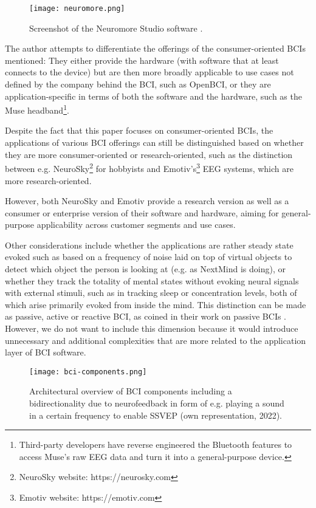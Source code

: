 \begin{figure}[ht]
  \centering
  \texttt{[image: neuromore.png]}
  \caption{Screenshot of the Neuromore Studio software \citep{neuromore_neuromore_nodate}.}
  \label{fig:neuromore}
\end{figure}

The author attempts to differentiate the offerings of the consumer-oriented BCIs mentioned: They either provide the hardware (with software that at least connects to the device) but are then more broadly applicable to use cases not defined by the company behind the BCI, such as OpenBCI, or they are application-specific in terms of both the software and the hardware, such as the Muse headband\footnote{Third-party developers have reverse engineered the Bluetooth features to access Muse's raw EEG data and turn it into a general-purpose device.}.

Despite the fact that this paper focuses on consumer-oriented BCIs, the applications of various BCI offerings can still be distinguished based on whether they are more consumer-oriented or research-oriented, such as the distinction between e.g. NeuroSky\footnote{NeuroSky website: https://neurosky.com} for hobbyists and Emotiv's\footnote{Emotiv website: https://emotiv.com} EEG systems, which are more research-oriented.

However, both NeuroSky and Emotiv provide a research version as well as a consumer or enterprise version of their software and hardware, aiming for general-purpose applicability across customer segments and use cases.

Other considerations include whether the applications are rather steady state evoked such as based on a frequency of noise laid on top of virtual objects to detect which object the person is looking at (e.g. as NextMind is doing), or whether they track the totality of mental states without evoking neural signals with external stimuli, such as in tracking sleep or concentration levels, both of which arise primarily evoked from inside the mind. This distinction can be made as passive, active or reactive BCI, as \citeauthor{alimardani_passive_2020} coined in their work on passive BCIs \citep{alimardani_passive_2020}. However, we do not want to include this dimension because it would introduce unnecessary and additional complexities that are more related to the application layer of BCI software.

\begin{figure}[!ht]
  \centering
  \texttt{[image: bci-components.png]}
  \caption{Architectural overview of BCI components including a bidirectionality due to neurofeedback in form of e.g. playing a sound in a certain frequency to enable SSVEP (own representation, 2022).}
  \label{fig:bci-components}
\end{figure}

